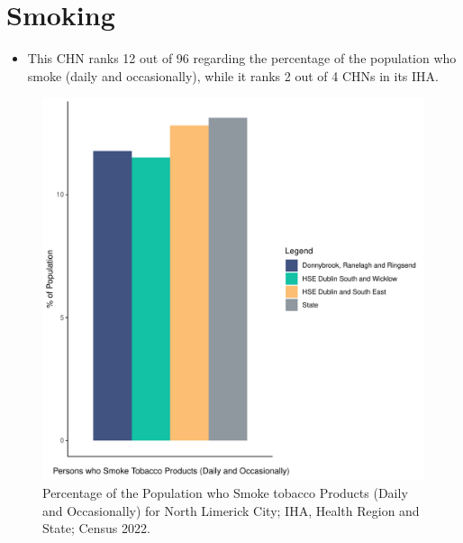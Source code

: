 \documentclass{article}
\begin{document}
\pagebreak

\section{Smoking}\label{sect:Smoking}
\begin{itemize}
\item This CHN ranks  12 out of 96 regarding the percentage of the population who smoke (daily and occasionally), while it ranks   2 out of 4 CHNs in its IHA.
\end{itemize}
\begin{figure}[H]
	\centering
	\includegraphics[width = 120mm]{../figures/SmokingED.pdf}
	\caption{Percentage of the Population who Smoke tobacco Products (Daily and Occasionally) for North Limerick City; IHA, Health Region and State; Census 2022.}
	\label{fig:2ae19629-1a6a-13a3-e055-000000000001}
	\end{figure}
	
\end{document}
